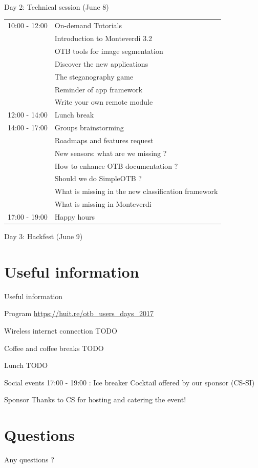 \documentclass[smaller]{beamer}
\begin{document}
\begin{frame}[label={sec:orgheadline11}]{Day 2: Technical session (June 8)}
\begin{center}
\begin{tabular}{ll}
\hline
10:00 - 12:00 & \alert{On-demand Tutorials}\\
 & Introduction to Monteverdi 3.2\\
 & OTB tools for image segmentation\\
 & Discover the new applications\\
 & The steganography game\\
 & Reminder of app framework\\
 & Write your own remote module\\
\hline
12:00 - 14:00 & \alert{Lunch break}\\
\hline
14:00 - 17:00 & \alert{Groups brainstorming}\\
 & Roadmaps and features request\\
 & New sensors: what are we missing ?\\
 & How to enhance OTB documentation ?\\
 & Should we do SimpleOTB ?\\
 & What is missing in the new classification framework\\
 & What is missing in Monteverdi\\
\hline
17:00 - 19:00 & \alert{Happy hours}\\
\hline
\end{tabular}
\end{center}
\end{frame}


\begin{frame}[label={sec:orgheadline12}]{Day 3: Hackfest (June 9)}
\end{frame}


\section{Useful information}
\label{sec:orgheadline15}
\begin{frame}[label={sec:orgheadline14}]{Useful information}
\begin{block}{Program}
\url{https://huit.re/otb_users_days_2017}   
\end{block}
\begin{block}{Wireless internet connection}
TODO
\end{block}
\begin{block}{Coffee and coffee breaks}
TODO
\end{block}
\begin{block}{Lunch}
TODO
\end{block}
\begin{block}{Social events}
17:00 - 19:00 : Ice breaker
Cocktail offered by our sponsor (CS-SI)
\end{block}
\begin{block}{Sponsor}
Thanks to CS for hosting and catering the event!
\end{block}
\end{frame}
\section{Questions}
\label{sec:orgheadline17}
\begin{frame}[label={sec:orgheadline16}]{Any questions ?}
\end{frame}
\end{document}
